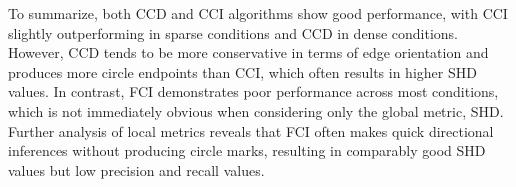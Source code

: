 \documentclass[twoside, 11pt]{article}
\newcommand*{\figref}[2][]{%
  \hyperref[{fig:#2}]{%
    Figure~\ref*{fig:#2}%
    \ifx\\#1\\%
    \else
      #1%
    \fi
  }%
}
\begin{document}

To summarize, both CCD and CCI algorithms show good performance, with CCI slightly outperforming in sparse conditions and CCD in dense conditions. However, CCD tends to be more conservative in terms of edge orientation and produces more circle endpoints than CCI, which often results in higher SHD values. In contrast, FCI demonstrates poor performance across most conditions, which is not immediately obvious when considering only the global metric, SHD. Further analysis of local metrics reveals that FCI often makes quick directional inferences without producing circle marks, resulting in comparably good SHD values but low precision and recall values.
\end{document}
